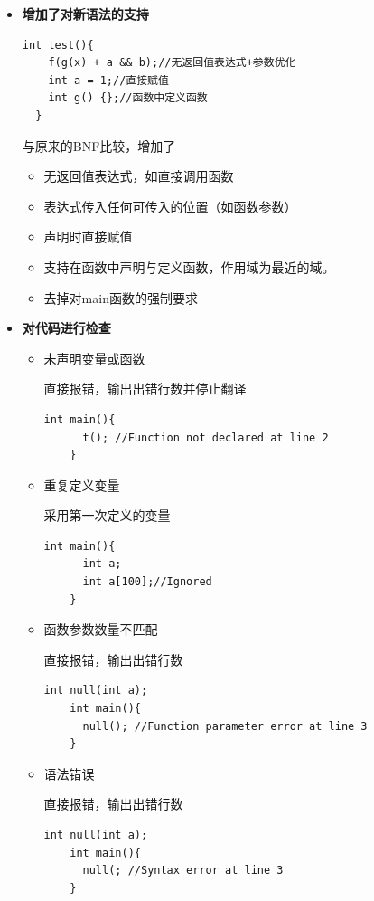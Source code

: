 \documentclass{ctexart}
\begin{document}
\begin{itemize}
  \item \textbf{增加了对新语法的支持}
  \begin{lstlisting}[basicstyle=\listingsfont]
  int test(){
    f(g(x) + a && b);//无返回值表达式+参数优化
    int a = 1;//直接赋值
    int g() {};//函数中定义函数
  }
  \end{lstlisting}
  与原来的BNF比较，增加了
  \begin{itemize}
    \item 无返回值表达式，如直接调用函数
    \item 表达式传入任何可传入的位置（如函数参数）
    \item 声明时直接赋值
    \item 支持在函数中声明与定义函数，作用域为最近的域。
    \item 去掉对main函数的强制要求
  \end{itemize}

  \item \textbf{对代码进行检查}
  \begin{itemize}
    \item 未声明变量或函数

    直接报错，输出出错行数并停止翻译
    \begin{lstlisting}[basicstyle=\listingsfont]
    int main(){
      t(); //Function not declared at line 2
    }
    \end{lstlisting}
    \item 重复定义变量

    采用第一次定义的变量
    \begin{lstlisting}[basicstyle=\listingsfont]
    int main(){
      int a;
      int a[100];//Ignored
    }
    \end{lstlisting}
    \item 函数参数数量不匹配

    直接报错，输出出错行数
    \begin{lstlisting}[basicstyle=\listingsfont]
    int null(int a);
    int main(){
      null(); //Function parameter error at line 3
    }
    \end{lstlisting}
    \item 语法错误

    直接报错，输出出错行数
    \begin{lstlisting}[basicstyle=\listingsfont]
    int null(int a);
    int main(){
      null(; //Syntax error at line 3
    }
    \end{lstlisting}
  \end{itemize}

\end{itemize}
\end{document}
